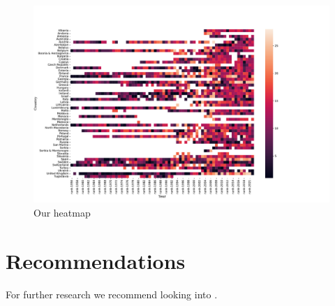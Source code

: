 \documentclass{article}
\begin{document}
\begin{figure}
\centering
\includegraphics[width=1\textwidth] {figheatmap.pdf}
\caption{\label{fig:heatmap} Our heatmap}
\end{figure}

\section{Recommendations}

For further research we recommend looking into \cite{geslers}. 
\clearpage


\end{document}
